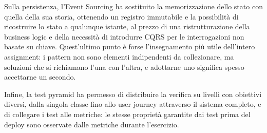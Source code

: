 \documentclass[12pt,a4paper]{article}
\begin{document}
Sulla persistenza, l'Event Sourcing ha sostituito la memorizzazione dello stato con quella della sua
storia, ottenendo un registro immutabile e la possibilit\`a di ricostruire lo stato a qualunque
istante, al prezzo di una ristrutturazione della business logic e della necessit\`a di introdurre
CQRS per le interrogazioni non basate su chiave. Quest'ultimo punto \`e forse l'insegnamento pi\`u
utile dell'intero assignment: i pattern non sono elementi indipendenti da collezionare, ma soluzioni
che si richiamano l'una con l'altra, e adottarne uno significa spesso accettarne un secondo.

Infine, la test pyramid ha permesso di distribuire la verifica su livelli con obiettivi diversi,
dalla singola classe fino allo user journey attraverso il sistema completo, e di collegare i test
alle metriche: le stesse propriet\`a garantite dai test prima del deploy sono osservate dalle metriche
durante l'esercizio.
\end{document}
